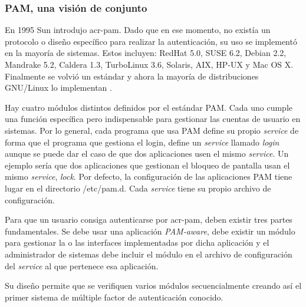 \documentclass[twoside, titlepage, 12pt, a4paper]{article}
\begin{document}
\subsubsection{PAM, una visión de conjunto}
En 1995 \gls{Sun} introdujo \gls{acr-pam}. Dado que en ese momento, no existía un protocolo o diseño específico para realizar la autenticación, su uso se implementó en la mayoría de sistemas. Estos incluyen:
RedHat 5.0,
SUSE 6.2,
Debian 2.2,
Mandrake 5.2,
Caldera 1.3,
TurboLinux 3.6,
Solaris,
AIX,
HP-UX y
Mac OS X.
Finalmente se volvió un estándar y ahora la mayoría de distribuciones \gls{GNU/Linux} lo implementan \cite{IBMPAM}. \par
Hay cuatro módulos distintos definidos por el estándar PAM. Cada uno cumple una función específica pero indispensable para gestionar las cuentas de usuario en sistemas\cite{redPAM}.
Por lo general, cada programa que usa PAM define su propio \textit{service} de forma que el programa que gestiona el login, define un \textit{service} llamado \textit{login} aunque se puede dar el caso de que dos aplicaciones usen el mismo \textit{service}. Un ejemplo sería que dos aplicaciones que gestionan el bloqueo de pantalla usan el mismo \textit{service}, \textit{lock}.
Por defecto, la configuración de las aplicaciones PAM tiene lugar en el directorio /etc/pam.d. Cada \textit{service} tiene su propio archivo de configuración. \par
Para que un usuario consiga autenticarse por \gls{acr-pam}, deben existir tres partes fundamentales. Se debe usar una aplicación \textit{PAM-aware}, debe existir un módulo para gestionar la o las interfaces implementadas por dicha aplicación y el administrador de sistemas debe incluir el módulo en el archivo de configuración del \textit{service} al que pertenece esa aplicación. \par
Su diseño permite que se verifiquen varios módulos secuencialmente creando así el primer sistema de múltiple factor de autenticación conocido. \par \noindent
\end{document}

